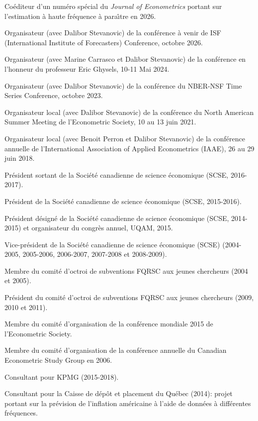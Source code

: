 \begin{description}
\item Co\'editeur d'un num\'ero sp\'ecial du {\it Journal of Econometrics} portant sur l'estimation \`a haute fr\'equence \`a para\^{\i}tre en 2026.
\item Organisateur (avec Dalibor Stevanovic) de la conf\'erence \`a venir de ISF (International Institute of Forecasters)  Conference, octobre 2026.
\item Organisateur (avec  Marine Carrasco et  Dalibor Stevanovic) de la conf\'erence en l'honneur du professeur  Eric Ghysels, 10-11 Mai 2024.
\item Organisateur (avec Dalibor Stevanovic) de la conf\'erence du NBER-NSF Time Series Conference, octobre 2023.
\item Organisateur local (avec Dalibor Stevanovic) de la conf\'erence du North American Summer Meeting de l'Econometric Society, 10 au 13 juin 2021.
\item Organisateur local (avec Benoit Perron et Dalibor Stevanovic) de la conf\'erence annuelle de l'International Association of Applied Econometrics (IAAE), 26 au 29 juin 2018.
\item Pr\'esident sortant de la Soci\'et\'e canadienne de science 
\'economique (SCSE, 2016-2017).
\item Pr\'esident de la Soci\'et\'e canadienne de science 
\'economique (SCSE, 2015-2016).
\item Pr\'esident d\'esign\'e de la Soci\'et\'e canadienne de science 
\'economique (SCSE, 2014-2015) et organisateur du congr\`es annuel, UQAM, 2015.
\item Vice-pr\'esident de la Soci\'et\'e canadienne de science
\'economique (SCSE) (2004-2005, 2005-2006, 2006-2007, 2007-2008 et 2008-2009).
\item Membre du comit\'e d'octroi de subventions FQRSC aux jeunes chercheurs (2004 et 2005).
\item Pr\'esident du comit\'e d'octroi de subventions FQRSC aux jeunes chercheurs (2009, 2010 et 2011).
\item Membre du comit\'e d'organisation de la conf\'erence mondiale 2015 
de l'Econometric Society.
\item Membre du comit\'e d'organisation de la conf\'erence annuelle
du Canadian Econometric Study Group en 2006.
\item Consultant pour KPMG (2015-2018).
\item Consultant pour la Caisse de d\'ep\^ot et placement du Qu\'ebec (2014): projet portant sur la pr\'evision de l'inflation am\'ericaine \`a l'aide de donn\'ees \`a diff\'erentes fr\'equences.

\end{description}
